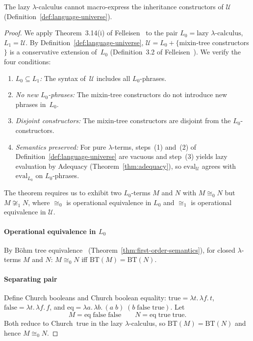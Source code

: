 \begin{theorem}
  \label{thm:cartesian-nonexpressibility}
  The lazy $\lambda$-calculus cannot macro-express the
  inheritance constructors of $\mathscr{U}$
  (Definition~\ref{def:language-universe}).
\end{theorem}

\begin{proof}
  We apply Theorem~3.14(i) of
  Felleisen~\cite{felleisen1991-expressive-power} to the pair
  $L_0 = \text{lazy $\lambda$-calculus}$,
  $L_1 = \mathscr{U}$.
  By Definition~\ref{def:language-universe},
  $\mathscr{U} = L_0 + \{$mixin-tree constructors$\}$
  is a conservative extension of~$L_0$
  (Definition~3.2 of
  Felleisen~\cite{felleisen1991-expressive-power}).
  We verify the four conditions:
  \begin{enumerate}
    \item[(i)] \emph{$L_0 \subseteq L_1$:}
      The syntax of~$\mathscr{U}$ includes all
      $L_0$-phrases.
    \item[(ii)] \emph{No new $L_0$-phrases:}
      The mixin-tree constructors do not introduce new
      phrases in~$L_0$.
    \item[(iii)] \emph{Disjoint constructors:}
      The mixin-tree constructors are disjoint from the
      $L_0$-constructors.
    \item[(iv)] \emph{Semantics preserved:}
      For pure $\lambda$-terms, steps~(1) and~(2) of
      Definition~\ref{def:language-universe} are vacuous
      and step~(3) yields lazy evaluation by Adequacy
      (Theorem~\ref{thm:adequacy}), so
      $\mathrm{eval}_{\mathscr{U}}$ agrees with
      $\mathrm{eval}_{L_0}$ on $L_0$-phrases.
  \end{enumerate}
  The theorem requires us to exhibit two $L_0$-terms
  $M$ and $N$ with $M \cong_0 N$ but
  $M \not\cong_1 N$, where $\cong_0$ is operational
  equivalence in $L_0$ and $\cong_1$ is operational
  equivalence in $\mathscr{U}$.

  \paragraph{Operational equivalence in $L_0$}
  By B\"ohm tree
  equivalence~\cite{abramsky1993-full-abstraction-lazy-lambda,abramsky1995-games-full-abstraction-lazy-lambda}
  (Theorem~\ref{thm:first-order-semantics}), for closed
  $\lambda$-terms $M$ and $N$:
  $M \cong_0 N$ iff $\mathrm{BT}(M) = \mathrm{BT}(N)$.

  \paragraph{Separating pair}
  Define Church booleans and Church boolean equality:
  $\mathrm{true} = \lambda t.\,\lambda f.\, t$,
  $\mathrm{false} = \lambda t.\,\lambda f.\, f$, and
  $\mathrm{eq} = \lambda a.\,\lambda b.\,
  (a\;b)\;(b\;\mathrm{false}\;\mathrm{true})$.
  Let
  \[
    M = \mathrm{eq}\;\mathrm{false}\;\mathrm{false}
    \qquad
    N = \mathrm{eq}\;\mathrm{true}\;\mathrm{true}.
  \]
  Both reduce to Church~$\mathrm{true}$ in the
  lazy $\lambda$-calculus, so
  $\mathrm{BT}(M) = \mathrm{BT}(N)$ and hence
  $M \cong_0 N$.


\end{proof}

